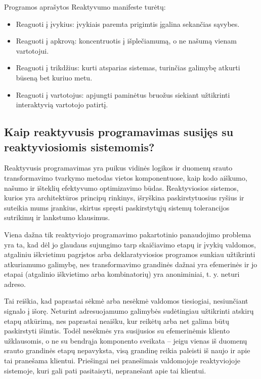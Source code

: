 Programos aprašytos Reaktyvumo manifeste turėtų:

\begin{itemize}
  \item Reaguoti į įvykius: įvykiais paremta prigimtis įgalina sekančias sąvybes.
  \item Reaguoti į apkrovą: koncentruotis į išplečiamumą, o ne našumą vienam vartotojui.
  \item Reaguoti į trikdžius: kurti atsparias sistemas, turinčias galimybę atkurti būseną bet kuriuo metu.
  \item Reaguoti į vartotojus: apjungti paminėtus bruožus siekiant užtikrinti interaktyvią vartotojo patirtį.
\end{itemize}

\subsection{Kaip reaktyvusis programavimas susijęs su reaktyviosiomis sistemomis?}

Reaktyvusis programavimas yra puikus vidinės logikos ir duomenų srauto transformavimo tvarkymo metodas vietos komponentuose, kaip kodo aiškumo, našumo ir išteklių efektyvumo optimizavimo būdas. Reaktyviosios sistemos, kurios yra architektūros principų rinkinys, išryškina paskirstytuosius ryšius ir suteikia mums įrankius, skirtus spręsti paskirstytųjų sistemų tolerancijos sutrikimų ir lankstumo klausimus.

Viena dažna tik reaktyviojo programavimo pakartotinio panaudojimo problema yra ta, kad dėl jo glaudaus sujungimo tarp skaičiavimo etapų ir įvykių valdomos, atgaliniu iškvietimu pagrįstos arba deklaratyviosios programos sunkiau užtikrinti atkuriamumo galimybę, nes transformavimo grandinės dažnai yra efemerinės ir jo etapai (atgalinio iškvietimo arba kombinatorių) yra anoniminiai, t. y. neturi adreso.

Tai reiškia, kad paprastai sėkmė arba nesėkmė valdomos tiesiogiai, nesiunčiant signalo į išorę. Neturint adresuojamumo galimybės sudėtingiau užtikrinti atskirų etapų atkūrimą, nes paprastai neaišku, kur reikėtų arba net galima būtų paskirstyti išimtis. Todėl nesėkmės yra susijusios su efemerinėmis kliento užklausomis, o ne su bendrąja komponento sveikata – jeigu vienas iš duomenų srauto grandinės etapų nepavyksta, visą grandinę reikia paleisti iš naujo ir apie tai pranešama klientui. Priešingai nei pranešimais valdomojoje reaktyviojoje sistemoje, kuri gali pati pasitaisyti, nepranešant apie tai klientui.

